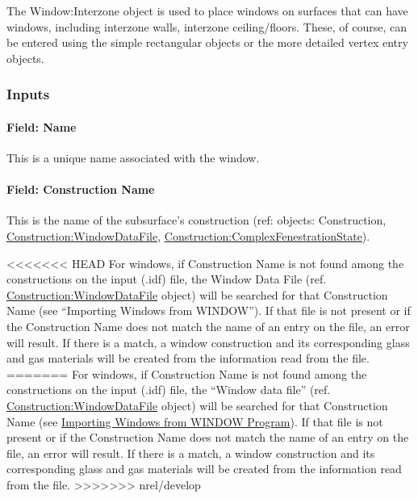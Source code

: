 The Window:Interzone object is used to place windows on surfaces that can have windows, including interzone walls, interzone ceiling/floors. These, of course, can be entered using the simple rectangular objects or the more detailed vertex entry objects.

\subsubsection{Inputs}\label{inputs-17-010}

\paragraph{Field: Name}\label{field-name-13-011}

This is a unique name associated with the window.

\paragraph{Field: Construction Name}\label{field-construction-name-13}

This is the name of the subsurface's construction (ref: objects: Construction, \hyperref[constructionwindowdatafile]{Construction:WindowDataFile}, \hyperref[constructioncomplexfenestrationstate]{Construction:ComplexFenestrationState}).

<<<<<<< HEAD
For windows, if Construction Name is not found among the constructions on the input (.idf) file, the Window Data File (ref. \hyperref[constructionwindowdatafile]{Construction:WindowDataFile} object) will be searched for that Construction Name (see ``Importing Windows from WINDOW''). If that file is not present or if the Construction Name does not match the name of an entry on the file, an error will result. If there is a match, a window construction and its corresponding glass and gas materials will be created from the information read from the file.
=======
For windows, if Construction Name is not found among the constructions on the input (.idf) file, the ``Window data file'' (ref. \hyperref[constructionwindowdatafile]{Construction:WindowDataFile} object) will be searched for that Construction Name (see \hyperref[importing-windows-from-window-program]{Importing Windows from WINDOW Program}). If that file is not present or if the Construction Name does not match the name of an entry on the file, an error will result. If there is a match, a window construction and its corresponding glass and gas materials will be created from the information read from the file.
>>>>>>> nrel/develop

